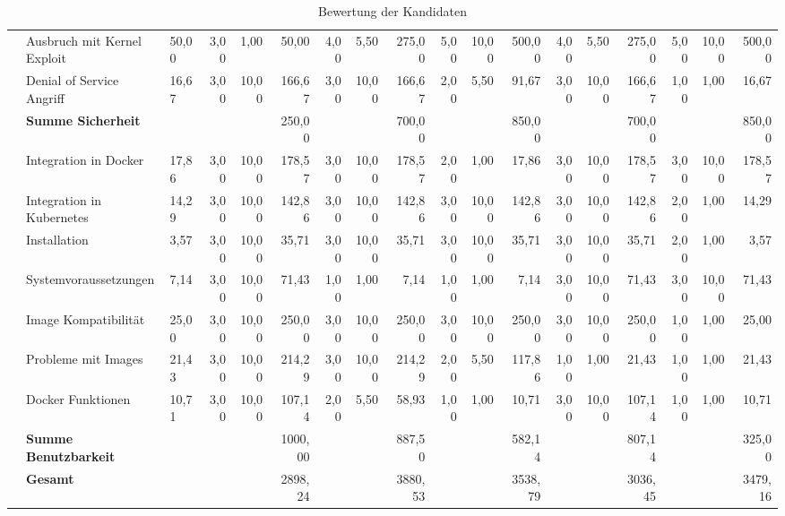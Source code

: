 \begin{table}
\begin{tabular}{|l|l|l|rrr|rrr|rrr|rrr|rrr|}
	& Ausbruch mit Kernel Exploit & 50,00 & 3,00 & 1,00 & 50,00 & 4,00 & 5,50 & 275,00 & 5,00 & 10,00 & 500,00 & 4,00 & 5,50 & 275,00 & 5,00 & 10,00 & 500,00 \\
	& Denial of Service Angriff & 16,67 & 3,00 & 10,00 & 166,67 & 3,00 & 10,00 & 166,67 & 2,00 & 5,50 & 91,67 & 3,00 & 10,00 & 166,67 & 1,00 & 1,00 & 16,67 \\ \cline{2-18} 
	& \textbf{Summe Sicherheit} & & & & 250,00 & & & 700,00 & & & 850,00 & & & 700,00 & & & 850,00 \\ \hline
	\multirow{8}{*}{\STAB{\rotatebox[origin=c]{90}{Benutzbarkeit}}}& Integration in Docker & 17,86 & 3,00 & 10,00 & 178,57 & 3,00 & 10,00 & 178,57 & 2,00 & 1,00 & 17,86 & 3,00 & 10,00 & 178,57 & 3,00 & 10,00 & 178,57 \\
	& Integration in Kubernetes & 14,29 & 3,00 & 10,00 & 142,86 & 3,00 & 10,00 & 142,86 & 3,00 & 10,00 & 142,86 & 3,00 & 10,00 & 142,86 & 2,00 & 1,00 & 14,29 \\
	& Installation & 3,57 & 3,00 & 10,00 & 35,71 & 3,00 & 10,00 & 35,71 & 3,00 & 10,00 & 35,71 & 3,00 & 10,00 & 35,71 & 2,00 & 1,00 & 3,57 \\
	& Systemvoraussetzungen & 7,14 & 3,00 & 10,00 & 71,43 & 1,00 & 1,00 & 7,14 & 1,00 & 1,00 & 7,14 & 3,00 & 10,00 & 71,43 & 3,00 & 10,00 & 71,43 \\
	& Image Kompatibilität & 25,00 & 3,00 & 10,00 & 250,00 & 3,00 & 10,00 & 250,00 & 3,00 & 10,00 & 250,00 & 3,00 & 10,00 & 250,00 & 1,00 & 1,00 & 25,00 \\
	& Probleme mit Images & 21,43 & 3,00 & 10,00 & 214,29 & 3,00 & 10,00 & 214,29 & 2,00 & 5,50 & 117,86 & 1,00 & 1,00 & 21,43 & 1,00 & 1,00 & 21,43 \\
	& Docker Funktionen & 10,71 & 3,00 & 10,00 & 107,14 & 2,00 & 5,50 & 58,93 & 1,00 & 1,00 & 10,71 & 3,00 & 10,00 & 107,14 & 1,00 & 1,00 & 10,71 \\ \cline{2-18} 
	& \textbf{Summe Benutzbarkeit} & & & & 1000,00 & & & 887,50 & & & 582,14 & & & 807,14 & & & 325,00 \\ \hline
	&\textbf{Gesamt} &  & & & 2898,24 & & & 3880,53 & & & 3538,79 & & & 3036,45 & & & 3479,16  \\ \hline
\end{tabular}
	\caption{Bewertung der Kandidaten}
	\label{tbl:bewertung}
\end{table}